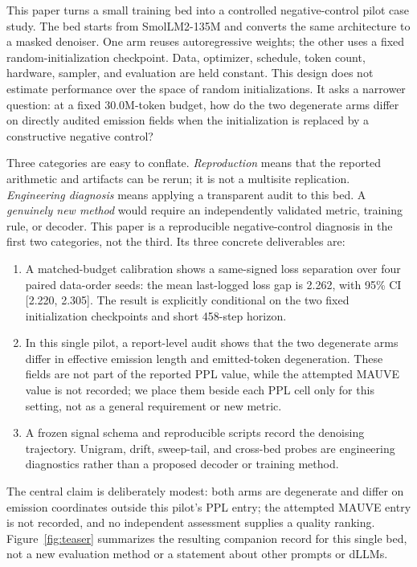 \documentclass{article}
\begin{document}
This paper turns a small training bed into a controlled negative-control pilot
case study.  The bed starts from SmolLM2-135M \citep{allal2025smollm2} and converts
the same architecture to a masked denoiser.  One arm reuses autoregressive
weights; the other uses a fixed random-initialization checkpoint.  Data,
optimizer, schedule, token count, hardware, sampler, and evaluation are held
constant.  This design does not estimate performance over the space of random
initializations.  It asks a narrower question: at a fixed 30.0M-token budget,
how do the two degenerate arms differ on directly audited emission fields when
the initialization is replaced by a constructive negative control?

Three categories are easy to conflate.  \emph{Reproduction} means that the
reported arithmetic and artifacts can be rerun; it is not a multisite
replication.  \emph{Engineering diagnosis} means applying a transparent audit
to this bed.  A \emph{genuinely new method} would require an independently
validated metric, training rule, or decoder.  This paper is a reproducible
negative-control diagnosis in the first two categories, not the third.  Its
three concrete deliverables are:

\begin{enumerate}
  \item A matched-budget calibration shows a same-signed loss separation over four
  paired data-order seeds: the mean last-logged loss gap is 2.262, with 95\%
  CI [2.220, 2.305].  The result is explicitly conditional on the two fixed
  initialization checkpoints and short 458-step horizon.
  \item In this single pilot, a report-level audit shows that the two degenerate
  arms differ in effective emission length and emitted-token degeneration.
  These fields are not part of the reported PPL value, while the attempted
  MAUVE value is not recorded; we place them beside each PPL cell only for this
  setting, not as a general requirement or new metric.
  \item A frozen signal schema and reproducible scripts record the denoising
  trajectory.  Unigram, drift, sweep-tail, and cross-bed probes are
  engineering diagnostics rather than a proposed decoder or training method.
\end{enumerate}

The central claim is deliberately modest: both arms are degenerate and differ
on emission coordinates outside this pilot's PPL entry; the attempted MAUVE
entry is not recorded, and no independent assessment supplies a quality
ranking.  Figure~\ref{fig:teaser}
summarizes the resulting companion record for this single bed, not a new
evaluation method or a statement about other prompts or dLLMs.
\end{document}
